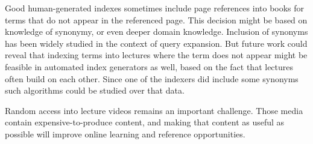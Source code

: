 Good human-generated indexes sometimes include page references into
books for terms that do not appear in the referenced page. This
decision might be based on knowledge of synonymy, or even deeper
domain knowledge. Inclusion of synonyms has been widely studied in the
context of query expansion. But future work could reveal that indexing
terms into lectures where the term does not appear might be feasible
in automated index generators as well, based on the fact that lectures
often build on each other. Since one of the indexers did include
some synonyms such algorithms could be studied over that data.

Random access into lecture videos remains an important
challenge. Those media contain expensive-to-produce content, and
making that content as useful as possible will improve online learning
and reference opportunities.


